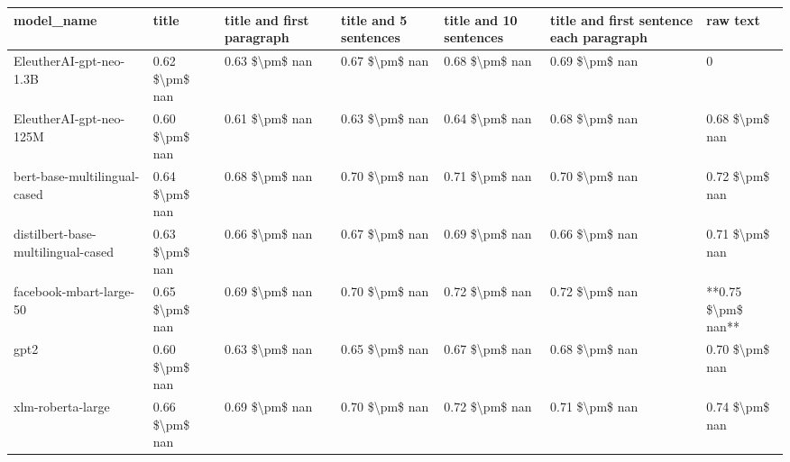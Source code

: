 \begin{tabular}{lllllll}
\toprule
                        model\_name &          title & title and first paragraph & title and 5 sentences & title and 10 sentences & title and first sentence each paragraph &           raw text \\
\midrule
           EleutherAI-gpt-neo-1.3B & 0.62 \$\textbackslash pm\$ nan &            0.63 \$\textbackslash pm\$ nan &        0.67 \$\textbackslash pm\$ nan &         0.68 \$\textbackslash pm\$ nan &                          0.69 \$\textbackslash pm\$ nan &                  0 \\
           EleutherAI-gpt-neo-125M & 0.60 \$\textbackslash pm\$ nan &            0.61 \$\textbackslash pm\$ nan &        0.63 \$\textbackslash pm\$ nan &         0.64 \$\textbackslash pm\$ nan &                          0.68 \$\textbackslash pm\$ nan &     0.68 \$\textbackslash pm\$ nan \\
      bert-base-multilingual-cased & 0.64 \$\textbackslash pm\$ nan &            0.68 \$\textbackslash pm\$ nan &        0.70 \$\textbackslash pm\$ nan &         0.71 \$\textbackslash pm\$ nan &                          0.70 \$\textbackslash pm\$ nan &     0.72 \$\textbackslash pm\$ nan \\
distilbert-base-multilingual-cased & 0.63 \$\textbackslash pm\$ nan &            0.66 \$\textbackslash pm\$ nan &        0.67 \$\textbackslash pm\$ nan &         0.69 \$\textbackslash pm\$ nan &                          0.66 \$\textbackslash pm\$ nan &     0.71 \$\textbackslash pm\$ nan \\
           facebook-mbart-large-50 & 0.65 \$\textbackslash pm\$ nan &            0.69 \$\textbackslash pm\$ nan &        0.70 \$\textbackslash pm\$ nan &         0.72 \$\textbackslash pm\$ nan &                          0.72 \$\textbackslash pm\$ nan & **0.75 \$\textbackslash pm\$ nan** \\
                              gpt2 & 0.60 \$\textbackslash pm\$ nan &            0.63 \$\textbackslash pm\$ nan &        0.65 \$\textbackslash pm\$ nan &         0.67 \$\textbackslash pm\$ nan &                          0.68 \$\textbackslash pm\$ nan &     0.70 \$\textbackslash pm\$ nan \\
                 xlm-roberta-large & 0.66 \$\textbackslash pm\$ nan &            0.69 \$\textbackslash pm\$ nan &        0.70 \$\textbackslash pm\$ nan &         0.72 \$\textbackslash pm\$ nan &                          0.71 \$\textbackslash pm\$ nan &     0.74 \$\textbackslash pm\$ nan \\
\bottomrule
\end{tabular}
